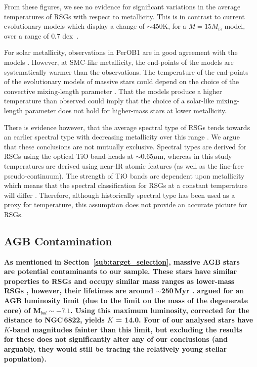 \documentclass[iop]{emulateapj}
\begin{document}
From these figures, we see no evidence for significant variations in the average temperatures of RSGs with respect to metallicity.
This is in contrast to current evolutionary models which display a change of $\sim$450K,
for a $M=15M_{\odot}$ model,
over a range of 0.7 dex~\citep{2012A&A...537A.146E,2013A&A...558A.103G}.

For solar metallicity, observations in PerOB1 are in good agreement with the models
\citep[see Figure 9 in][]{2014ApJ...788...58G}.
However, at SMC-like metallicity, the end-points of the models are systematically warmer than the observations.
The temperature of the end-points of the evolutionary models of massive stars could depend on the choice of the convective mixing-length parameter
\citep{1992A&AS...96..269S}.
That the models produce a higher temperature than observed could imply that the choice of a solar-like mixing-length parameter does not hold for higher-mass stars at lower metallicity.

There is evidence however,
that the average spectral type of RSGs tends towards an earlier spectral type with decreasing metallicity over this range
\citep{1979ApJ...231..384H,2012AJ....144....2L}.
We argue that these conclusions are not mutually exclusive.
Spectral types are derived for RSGs using the optical TiO band-heads at
$\sim$0.65$\mu$m,
whereas in this study temperatures are derived using near-IR atomic features
(as well as the line-free pseudo-continuum).
The strength of TiO bands are dependent upon metallicity which means that
the spectral classification for RSGs at a constant temperature will differ
\citep{2013ApJ...767....3D}.
Therefore, although historically spectral type has been used as a proxy for temperature, this assumption does not provide an accurate picture for RSGs.


\subsection{AGB Contamination} %
\label{sub:AGB_contamination}
\textbf{
As mentioned in Section~\ref{sub:target_selection}, massive AGB stars are potential contaminants to our sample.
These stars have similar properties to RSGs and occupy similar mass ranges as lower-mass RSGs
\citep{2005ARA&A..43..435H},
however, their lifetimes are around $\sim$250\,Myr
\citep{2010MNRAS.401.1453D}.
\cite{1983ApJ...272...99W} argued for an AGB luminosity limit
(due to the limit on the mass of the degenerate core) of M$_{bol}\sim-7.1$.
Using this maximum luminosity, corrected for the distance to NGC\,6822,
yields $K$ = 14.0.
Four of our analysed stars have $K$-band magnitudes fainter than this limit,
but excluding the results for these does not significantly alter any of our conclusions
(and arguably, they would still be tracing the relatively young stellar population).
}
\end{document}
